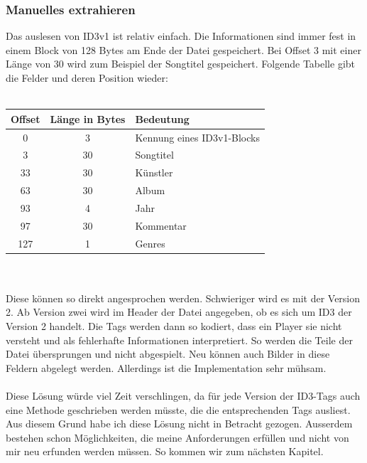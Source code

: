 \documentclass[12pt,a4paper,ngerman]{report}
\begin{document}
\subsubsection{Manuelles extrahieren}
Das auslesen von ID3v1 ist relativ einfach. Die Informationen sind immer fest in einem Block von 128 Bytes am Ende der Datei gespeichert. Bei Offset 3 mit einer Länge von 30 wird zum Beispiel der Songtitel gespeichert. Folgende Tabelle gibt die Felder und deren Position wieder:\\ \\
\begin{tabular}{|c|c|l|} \hline
 \textbf{Offset} & \textbf{Länge in Bytes} & \textbf{Bedeutung}\\
 \hline
 0 & 3 & Kennung eines ID3v1-Blocks\\ \hline
 3 & 30 & Songtitel\\ \hline
 33 & 30 & Künstler\\ \hline
 63 & 30 & Album\\ \hline
 93 & 4 & Jahr\\ \hline
 97 & 30 & Kommentar\\ \hline
 127 & 1 & Genres\\ \hline
\end{tabular} \\ \\
Diese können so direkt angesprochen werden. Schwieriger wird es mit der Version 2. Ab Version zwei wird im Header der Datei angegeben, ob es sich um ID3 der Version 2 handelt. Die Tags werden dann so kodiert, dass ein Player sie nicht versteht und als fehlerhafte Informationen interpretiert. So werden die Teile der Datei übersprungen und nicht abgespielt. Neu können auch Bilder in diese Feldern abgelegt werden. Allerdings ist die Implementation sehr mühsam.
\\
\\
Diese Lösung würde viel Zeit verschlingen, da für jede Version der ID3-Tags auch eine Methode geschrieben werden müsste, die die entsprechenden Tags ausliest. Aus diesem Grund habe ich diese Lösung nicht in Betracht gezogen. Ausserdem bestehen schon Möglichkeiten, die meine Anforderungen erfüllen und nicht von mir neu erfunden werden müssen. So kommen wir zum nächsten Kapitel.
\end{document}

